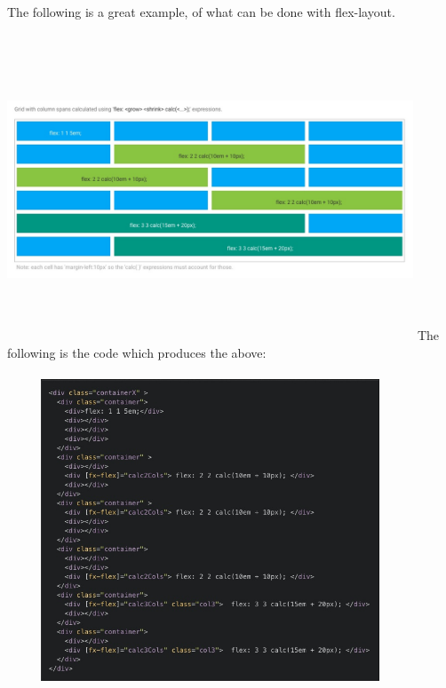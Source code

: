 The following is a great example, of what can be done with flex-layout.
\\
\\
\includegraphics[width=12.1cm, height=9cm]{pwa/responsive/flex-layout/flex-layout-grid}
The following is the code which produces the above:
\\
\\
\includegraphics[width=12.1cm, height=9cm]{pwa/responsive/flex-layout/flex-layout-code}
